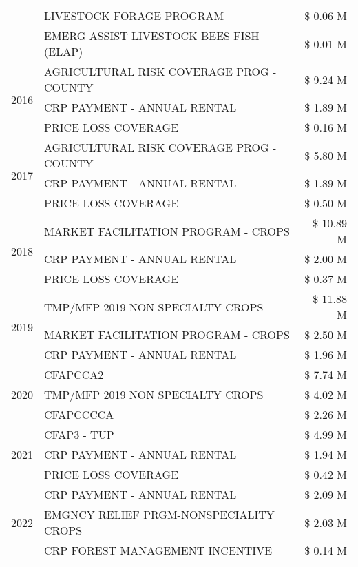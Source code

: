 \begin{tabular}{llr}
 & LIVESTOCK FORAGE PROGRAM & \$ 0.06 M \\
 & EMERG ASSIST LIVESTOCK BEES FISH (ELAP) & \$ 0.01 M \\
\cline{1-3}
\multirow[t]{3}{*}{2016} & AGRICULTURAL RISK COVERAGE PROG - COUNTY & \$ 9.24 M \\
 & CRP PAYMENT - ANNUAL RENTAL & \$ 1.89 M \\
 & PRICE LOSS COVERAGE & \$ 0.16 M \\
\cline{1-3}
\multirow[t]{3}{*}{2017} & AGRICULTURAL RISK COVERAGE PROG - COUNTY & \$ 5.80 M \\
 & CRP PAYMENT - ANNUAL RENTAL & \$ 1.89 M \\
 & PRICE LOSS COVERAGE & \$ 0.50 M \\
\cline{1-3}
\multirow[t]{3}{*}{2018} & MARKET FACILITATION PROGRAM - CROPS & \$ 10.89 M \\
 & CRP PAYMENT - ANNUAL RENTAL & \$ 2.00 M \\
 & PRICE LOSS COVERAGE & \$ 0.37 M \\
\cline{1-3}
\multirow[t]{3}{*}{2019} & TMP/MFP 2019 NON SPECIALTY CROPS & \$ 11.88 M \\
 & MARKET FACILITATION PROGRAM - CROPS & \$ 2.50 M \\
 & CRP PAYMENT - ANNUAL RENTAL & \$ 1.96 M \\
\cline{1-3}
\multirow[t]{3}{*}{2020} & CFAPCCA2 & \$ 7.74 M \\
 & TMP/MFP 2019 NON SPECIALTY CROPS & \$ 4.02 M \\
 & CFAPCCCCA & \$ 2.26 M \\
\cline{1-3}
\multirow[t]{3}{*}{2021} & CFAP3 - TUP & \$ 4.99 M \\
 & CRP PAYMENT - ANNUAL RENTAL & \$ 1.94 M \\
 & PRICE LOSS COVERAGE & \$ 0.42 M \\
\cline{1-3}
\multirow[t]{3}{*}{2022} & CRP PAYMENT - ANNUAL RENTAL & \$ 2.09 M \\
 & EMGNCY RELIEF PRGM-NONSPECIALITY CROPS & \$ 2.03 M \\
 & CRP FOREST MANAGEMENT INCENTIVE & \$ 0.14 M \\
\cline{1-3}
\bottomrule
\end{tabular}
